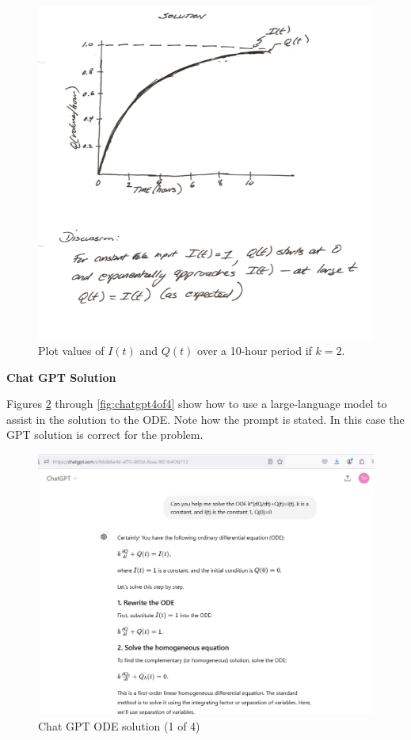 \documentclass[12pt]{article}
\begin{document}
\begin{enumerate}
\begin{figure}[h!] %
   \centering
   \includegraphics[width=6in]{es1-pr4-scan2.png} 
   \caption{Plot values of $I(t)$ and $Q(t)$ over a 10-hour period if $k=2$.}
   \label{fig:es1-pr4-scan2}
\end{figure}

\textbf{Chat GPT Solution}

Figures \ref{fig:chatgpt1of4} through \ref{fig:chatgpt4of4} show how to use a large-language model to assist in the solution to the ODE.  Note how the prompt is stated.  In this case the GPT solution is correct for the problem.

\begin{figure}[h!] %
   \centering
   \includegraphics[width=6in]{chatgpt1of4.png} 
   \caption{Chat GPT ODE solution (1 of 4)}
   \label{fig:chatgpt1of4}
\end{figure}


\end{enumerate}
\end{document}
